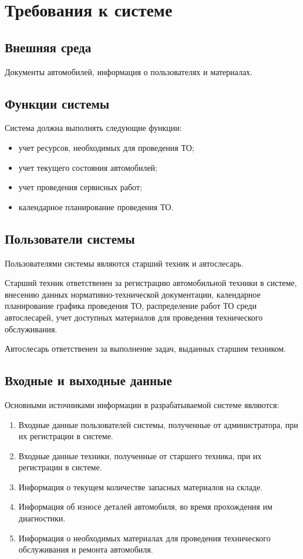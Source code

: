 \section{Требования к системе}
\subsection{Внешняя среда}
Документы автомобилей, информация о пользователях и материалах.

\subsection{Функции системы}
Система должна выполнять следующие функции:
\begin{itemize}
  \item учет ресурсов, необходимых для проведения ТО;
  \item учет текущего состояния автомобилей;
  \item учет проведения сервисных работ;
  \item календарное планирование проведения ТО.
\end{itemize}

\subsection{Пользователи системы}
Пользователями системы являются старший техник и автослесарь.

Старший техник ответственен за регистрацию автомобильной техники в системе,
внесению данных нормативно-технической документации, календарное планирование
графика проведения ТО, распределение работ ТО среди автослесарей, учет доступных
материалов для проведения технического обслуживания.

Автослесарь ответственен за выполнение задач, выданных старшим техником.

\subsection{Входные и выходные данные}
Основными источниками информации в разрабатываемой системе являются:
\begin{enumerate}
  \item Входные данные пользователей системы, полученные от администратора,
    при их регистрации в системе.
    \item Входные данные техники, полученные от старшего техника, при их
    регистрации в системе.
  \item Информация о текущем количестве запасных материалов на складе.
  \item Информация об износе деталей автомобиля, во время прохождения им
        диагностики.
  \item Информация о необходимых материалах для проведения технического
        обслуживания и ремонта автомобиля.
\end{enumerate}

